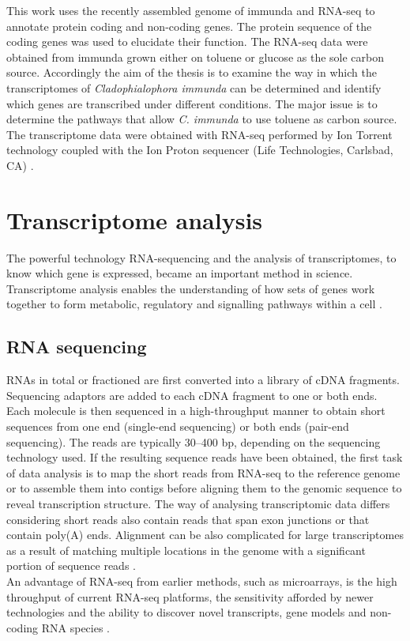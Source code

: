 \documentclass[12pt, a4paper]{report}
\begin{document}
This work uses the recently assembled genome of {\Cladophialophora immunda} and RNA-seq to annotate protein coding and non-coding genes. The protein sequence of the coding genes was used to elucidate their function. The RNA-seq data were obtained from {\Cladophialophora immunda} grown either on toluene or glucose as the sole carbon source. 
Accordingly the aim of the thesis is to examine the way in which the transcriptomes of \textit{Cladophialophora immunda} can be determined and identify which genes are transcribed under different conditions. The major issue is to determine the pathways that allow \textit{C. immunda} to use toluene as carbon source.\\ 
The transcriptome data were obtained with RNA-seq performed by Ion Torrent technology coupled with the Ion Proton sequencer (Life Technologies, Carlsbad, CA) \cite{BarbaraBlasi2015}. 

\section{Transcriptome analysis}
The powerful technology RNA-sequencing and the analysis of transcriptomes, to know which gene is expressed, became an important method in science. Transcriptome analysis enables the understanding of how sets of genes work together to form metabolic, regulatory and signalling pathways within a cell \cite{Xiong2006}.  
\subsection{RNA sequencing}
RNAs in total or fractioned are first converted into a library of cDNA fragments. Sequencing adaptors are added to each cDNA fragment to one or both ends. Each molecule is then sequenced in a high-throughput manner to obtain short sequences from one end (single-end sequencing) or both ends (pair-end sequencing). The reads are typically 30–400 bp, depending on the sequencing technology used. If the resulting sequence reads have been obtained, the first task of data analysis is to map the short reads from RNA-seq to the reference genome or to assemble them into contigs before aligning them to the genomic sequence to reveal transcription structure. The way of analysing transcriptomic data differs considering short reads also contain reads that span exon junctions or that contain poly(A) ends. Alignment can be also complicated for large transcriptomes as a result of matching multiple locations in the genome with a significant portion of sequence reads \cite{Wang2010}.  \\
An advantage of RNA-seq from earlier methods, such as microarrays, is the high throughput of current RNA-seq platforms, the sensitivity afforded by newer technologies and the ability to discover novel transcripts, gene models and non-coding RNA species \cite{Korpelainen2014}.  \\
\end{document}

